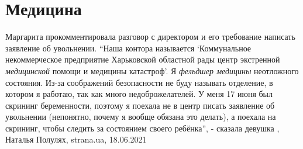  
 
 
 
 
\chapter{Медицина}
\label{sec:slova.medicina}

Маргарита прокомментировала разговор с директором и его требование написать
заявление об увольнении.  \enquote{Наша контора называется
\enquote{Коммунальное некоммерческое предприятие Харьковской областной рады
центр экстренной \emph{медицинской} помощи и медицины катастроф}. Я \emph{фельдшер медицины}
неотложного состояния. Из-за соображений безопасности не буду называть
отделение, в котором я работаю, так как много недоброжелателей. У меня 17 июня
был скрининг беременности, поэтому я поехала не в центр писать заявление об
увольнении (непонятно, почему я вообще обязана это делать), а поехала на
скрининг, чтобы следить за состоянием своего ребёнка}, - сказала девушка
,
Наталья Полулях, strana.ua, 18.06.2021

